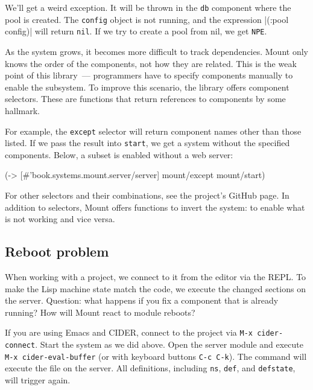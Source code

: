 We'll get a weird exception. It will be thrown in the \verb|db| component where the pool is created. The \verb|config| object is not running, and the expression \spverb|(:pool config)| will return \verb|nil|. If we try to create a pool from nil, we get \verb|NPE|.

As the system grows, it becomes more difficult to track dependencies. Mount only knows the order of the components, not how they are related. This is the weak point of this library~--- programmers have to specify components manually to enable the subsystem. To improve this scenario, the library offers component selectors. These are functions that return references to components by some hallmark.

For example, the \verb|except| selector will return component names other than those listed. If we pass the result into \verb|start|, we get a system without the specified components. Below, a subset is enabled without a web server:

\begin{english}
  \begin{clojure}
(-> [#'book.systems.mount.server/server]
    mount/except
    mount/start)
  \end{clojure}
\end{english}

For other selectors and their combinations, see the project's GitHub page. In addition to selectors, Mount offers functions to invert the system: to enable what is not working and vice versa.

\subsection{Reboot problem}

When working with a project, we connect to it from the editor via the REPL. To make the Lisp machine state match the code, we execute the changed sections on the server. Question: what happens if you fix a component that is already running? How will Mount react to module reboots?


If you are using Emacs and CIDER, connect to the project via \verb|M-x cider-connect|. Start the system as we did above. Open the server module and execute \verb|M-x cider-eval-buffer| (or with keyboard buttons \verb|C-c C-k|). The command will execute the file on the server. All definitions, including \verb|ns|, \verb|def|, and \verb|defstate|, will trigger again.

